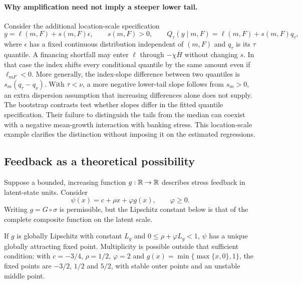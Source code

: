 \paragraph{Why amplification need not imply a steeper lower tail.}
Consider the additional location-scale specification
\begin{equation}\label{eq:location-scale}
 y=\ell(m,F)+s(m,F)\epsilon,\qquad s(m,F)>0,
 \qquad Q_\tau(y\mid m,F)=\ell(m,F)+s(m,F)q_\tau,
\end{equation}
where $\epsilon$ has a fixed continuous distribution independent of $(m,F)$
and $q_\tau$ is its $\tau$ quantile. A financing shortfall may enter
$\ell$ through $-\chi\overline H$ without changing $s$. In that case the
index shifts every conditional quantile by the same amount even if
$\ell_{mF}<0$. More generally, the index-slope difference between two
quantiles is $s_m(q_\tau-q_\nu)$. With $\tau<\nu$, a more negative
lower-tail slope follows from $s_m>0$, an extra dispersion assumption that
increasing differences alone does not supply. The bootstrap contrasts test
whether slopes differ in the fitted quantile specification. Their failure to
distinguish the tails from the median can coexist with a negative
mean-growth interaction with banking stress. This location-scale example
clarifies the distinction without imposing it on the estimated regressions.

\subsection{Feedback as a theoretical possibility}\label{subsec:trap}
Suppose a bounded, increasing function $g:\mathbb{R}\to\mathbb{R}$ describes stress feedback
in latent-state units. Consider
\begin{equation}\label{eq:feedback}
 \psi(x)=c+\rho x+\varphi g(x),\qquad \varphi\ge0.
\end{equation}
Writing $g=G\circ\sigma$ is permissible, but the Lipschitz constant below
is that of the complete composite function on the latent scale.

\begin{proposition}\label{prop:trap}
If $g$ is globally Lipschitz with constant $L_g$ and
$0\le\rho+\varphi L_g<1$, $\psi$ has a unique globally attracting fixed
point. Multiplicity is possible outside that sufficient condition: with
$c=-3/4$, $\rho=1/2$, $\varphi=2$ and
$g(x)=\min\{\max\{x,0\},1\}$, the fixed points are $-3/2$, $1/2$ and
$5/2$, with stable outer points and an unstable middle point.
\end{proposition}

